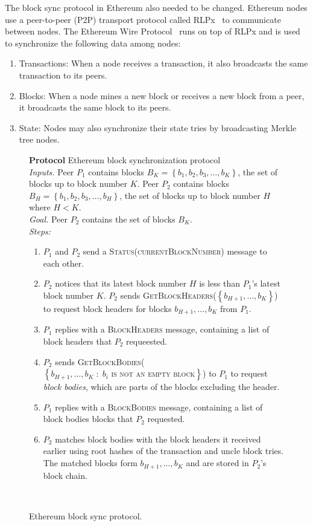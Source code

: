 \documentclass[12pt]{article}
\makeatletter
\newcounter{protocol}
\newenvironment{protocol}[1]
  {\par\addvspace{\topsep}
   \noindent
   \tabularx{\linewidth}{@{} X @{}}
    \hline
    \refstepcounter{protocol}\textbf{Protocol \theprotocol} #1 \\
    \hline}
  { \\
    \hline
   \endtabularx
   \par\addvspace{\topsep}}
\newcommand{\sbline}{\\[.5\normalbaselineskip]}%
\newcommand{\set}[1]{\left\{#1\right\}}
\newcommand{\setc}[2]{\left\{#1 \; :\; #2 \right\}}
\makeatother
\begin{document}
The block sync protocol in Ethereum also needed to be changed. Ethereum nodes use a peer-to-peer (P2P) transport protocol called RLPx~\cite{rlpx} to communicate between nodes. The Ethereum Wire Protocol~\cite{ethereum-wire-protocol} runs on top of RLPx and is used to synchronize the following data among nodes:
\begin{enumerate}
  \item Transactions: When a node receives a transaction, it also broadcasts the same transaction to its peers.
  \item Blocks: When a node mines a new block or receives a new block from a peer, it broadcasts the same block to its peers.
  \item State: Nodes may also synchronize their state tries by broadcasting Merkle tree nodes.
\end{enumerate}


\begin{figure}[H]
  \begin{protocol}{Ethereum block synchronization protocol}
    \emph{Inputs.} Peer $P_1$ contains blocks $B_K = \set{b_{1}, b_{2}, b_{3}, \ldots, b_{K}}$, the set of blocks up to block number $K$. Peer $P_2$ contains blocks $B_H = \set{b_{1}, b_{2}, b_{3}, \ldots, b_{H}}$, the set of blocks up to block number $H$ where $H < K$.
    \sbline
    \emph{Goal.} Peer $P_2$ contains the set of blocks $B_K$.
    \sbline
    \emph{Steps:}
    \begin{enumerate}
      \item $P_1$ and $P_2$ send a \textsc{Status(currentBlockNumber)} message to each other.
      \item $P_2$ notices that its latest block number $H$ is less than $P_1$'s latest block number $K$. $P_2$ sends \textsc{GetBlockHeaders($\set{b_{H+1}, \ldots, b_{K}}$)} to request block headers for blocks $b_{H + 1}, \ldots, b_{K}$ from $P_1$. \label{syncprotocol:requestBlockHeaders}
      \item $P_1$ replies with a \textsc{BlockHeaders} message, containing a list of block headers that $P_2$ requeested. \label{syncprotocol:replyBlockHeaders}
      \item $P_2$ sends \textsc{GetBlockBodies($\setc{b_{H+1}, \ldots, b_{K}}{\text{$b_i$ is not an empty block}}$)} to $P_1$ to request \emph{block bodies}, which are parts of the blocks excluding the header. \label{syncprotocol:requestBlockBodies}
      \item $P_1$ replies with a \textsc{BlockBodies} message, containing a list of block bodies blocks that $P_2$ requested. \label{syncprotocol:replyBlockBodies}
      \item $P_2$ matches block bodies with the block headers it received earlier using root hashes of the transaction and uncle block tries. The matched blocks form $b_{H + 1}, \ldots, b_{K}$ and are stored in $P_2$'s block chain. \label{syncprotocol:reconstruct}
    \end{enumerate}
  \end{protocol}
  \caption{Ethereum block sync protocol.} \label{syncprotocol}
\end{figure}
\end{document}
